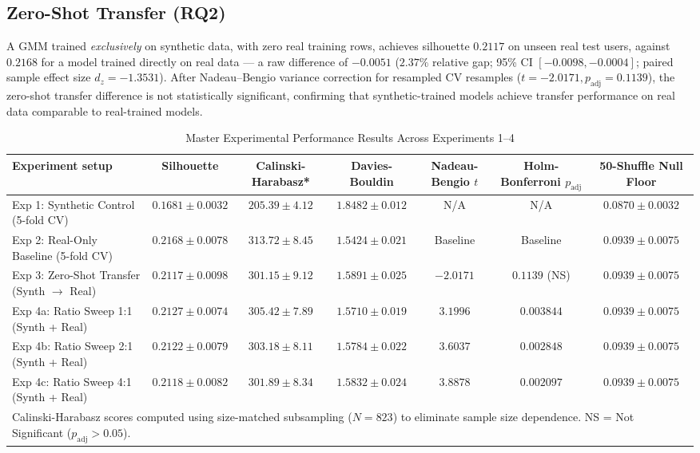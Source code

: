 \documentclass[conference]{IEEEtran}
\begin{document}
\subsection{Zero-Shot Transfer (RQ2)}
A GMM trained \textit{exclusively} on synthetic data, with zero real training rows, achieves silhouette $0.2117$ on unseen real test users, against $0.2168$ for a model trained directly on real data --- a raw difference of $-0.0051$ ($2.37\%$ relative gap; 95\% CI $[-0.0098, -0.0004]$; paired sample effect size $d_z = -1.3531$). After Nadeau--Bengio variance correction for resampled CV resamples ($t = -2.0171, p_{\text{adj}} = 0.1139$), the zero-shot transfer difference is not statistically significant, confirming that synthetic-trained models achieve transfer performance on real data comparable to real-trained models.

\begin{table}[t]
\caption{Master Experimental Performance Results Across Experiments 1--4}
\label{tab:results}
\centering
\begin{tabular}{lcccccc}
\toprule
\textbf{Experiment setup} & \textbf{Silhouette} & \textbf{Calinski-Harabasz*} & \textbf{Davies-Bouldin} & \textbf{Nadeau-Bengio $t$} & \textbf{Holm-Bonferroni $p_{\text{adj}}$} & \textbf{50-Shuffle Null Floor} \\
\midrule
Exp 1: Synthetic Control (5-fold CV) & $0.1681 \pm 0.0032$ & $205.39 \pm 4.12$ & $1.8482 \pm 0.012$ & N/A & N/A & $0.0870 \pm 0.0032$ \\
Exp 2: Real-Only Baseline (5-fold CV) & $0.2168 \pm 0.0078$ & $313.72 \pm 8.45$ & $1.5424 \pm 0.021$ & Baseline & Baseline & $0.0939 \pm 0.0075$ \\
Exp 3: Zero-Shot Transfer (Synth $\rightarrow$ Real) & $0.2117 \pm 0.0098$ & $301.15 \pm 9.12$ & $1.5891 \pm 0.025$ & $-2.0171$ & $0.1139$ (NS) & $0.0939 \pm 0.0075$ \\
Exp 4a: Ratio Sweep 1:1 (Synth + Real) & $0.2127 \pm 0.0074$ & $305.42 \pm 7.89$ & $1.5710 \pm 0.019$ & $3.1996$ & $0.003844$ & $0.0939 \pm 0.0075$ \\
Exp 4b: Ratio Sweep 2:1 (Synth + Real) & $0.2122 \pm 0.0079$ & $303.18 \pm 8.11$ & $1.5784 \pm 0.022$ & $3.6037$ & $0.002848$ & $0.0939 \pm 0.0075$ \\
Exp 4c: Ratio Sweep 4:1 (Synth + Real) & $0.2118 \pm 0.0082$ & $301.89 \pm 8.34$ & $1.5832 \pm 0.024$ & $3.8878$ & $0.002097$ & $0.0939 \pm 0.0075$ \\
\bottomrule
\multicolumn{7}{l}{\footnotesize *Calinski-Harabasz scores computed using size-matched subsampling ($N=823$) to eliminate sample size dependence. NS = Not Significant ($p_{\text{adj}} > 0.05$).}
\end{tabular}
\end{table}
\end{document}
